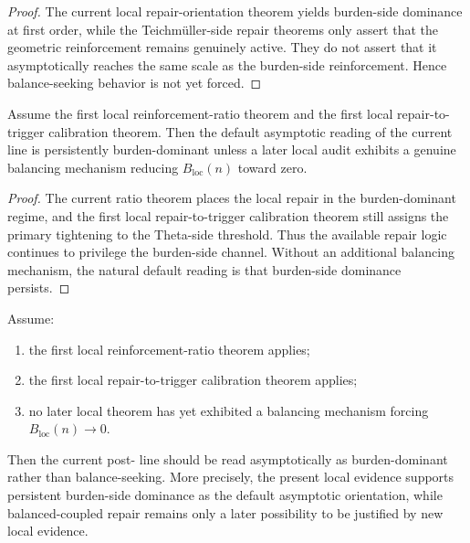 \begin{proof}
The current local repair-orientation theorem yields burden-side dominance at first order, while the Teichmüller-side repair theorems only assert that the geometric reinforcement remains genuinely active. They do not assert that it asymptotically reaches the same scale as the burden-side reinforcement. Hence balance-seeking behavior is not yet forced.
\end{proof}

\begin{proposition}
\label{prop:current-line-naturally-read-as-burden-dominant-unless-later-balancing-evidence-appears}
Assume the first local reinforcement-ratio theorem and the first local repair-to-trigger calibration theorem.
Then the default asymptotic reading of the current line is persistently burden-dominant unless a later local audit exhibits a genuine balancing mechanism reducing \(B_{\mathrm{loc}}(n)\) toward zero.
\end{proposition}

\begin{proof}
The current ratio theorem places the local repair in the burden-dominant regime, and the first local repair-to-trigger calibration theorem still assigns the primary tightening to the Theta-side threshold. Thus the available repair logic continues to privilege the burden-side channel. Without an additional balancing mechanism, the natural default reading is that burden-side dominance persists.
\end{proof}

\begin{theorem}
\label{thm:first-local-asymptotic-orientation-theorem}
Assume:
\begin{enumerate}[leftmargin=2em,label=(\alph*)]
 \item the first local reinforcement-ratio theorem applies;
 \item the first local repair-to-trigger calibration theorem applies;
 \item no later local theorem has yet exhibited a balancing mechanism forcing \(B_{\mathrm{loc}}(n)\to 0\).
\end{enumerate}
Then the current post- line should be read asymptotically as burden-dominant rather than balance-seeking.
More precisely, the present local evidence supports persistent burden-side dominance as the default asymptotic orientation, while balanced-coupled repair remains only a later possibility to be justified by new local evidence.
\end{theorem}

